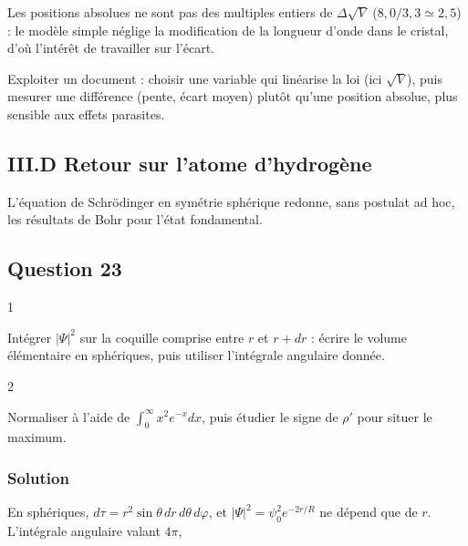 \documentclass[11pt,a4paper]{article}
\begin{document}
Les positions absolues ne sont pas des multiples entiers de \(\Delta\sqrt V\) (\(8{,}0/3{,}3\simeq2{,}5\)) : le modèle simple néglige la modification de la longueur d'onde dans le cristal, d'où l'intérêt de travailler sur l'écart.

\begin{methode}

Exploiter un document : choisir une variable qui linéarise la loi (ici \(\sqrt V\)), puis mesurer une différence (pente, écart moyen) plutôt qu'une position absolue, plus sensible aux effets parasites.

\end{methode}

\hypertarget{iii.d-retour-sur-latome-dhydroguxe8ne}{%
\subsection{III.D Retour sur l'atome d'hydrogène}\label{iii.d-retour-sur-latome-dhydroguxe8ne}}

L'équation de Schrödinger en symétrie sphérique redonne, sans postulat ad hoc, les résultats de Bohr pour l'état fondamental.

\hypertarget{question-23}{%
\subsection{Question 23}\label{question-23}}

\begin{indication}{1}

Intégrer \(|\Psi|^2\) sur la coquille comprise entre \(r\) et \(r+dr\) : écrire le volume élémentaire en sphériques, puis utiliser l'intégrale angulaire donnée.

\end{indication}

\begin{indication}{2}

Normaliser à l'aide de \(\int_0^\infty x^2e^{-x}dx\), puis étudier le signe de \(\rho'\) pour situer le maximum.

\end{indication}

\hypertarget{solution-22}{%
\subsubsection{Solution}\label{solution-22}}

En sphériques, \(d\tau=r^2\sin\theta\,dr\,d\theta\,d\varphi\), et \(|\Psi|^2=\psi_0^2e^{-2r/R}\) ne dépend que de \(r\). L'intégrale angulaire valant \(4\pi\),
\end{document}
